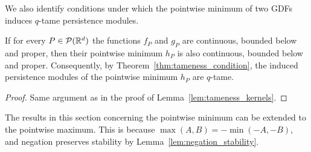 We also identify conditions under which the pointwise minimum of two GDFs
induces $q$-tame persistence modules.
\begin{lemma}
    If for every $P \in \mathcal{P}(\mathbb{R}^d)$ the functions $f_P$ and $g_P$ are
    continuous, bounded below and proper, then their pointwise minimum $h_P$
    is also continuous, bounded below and proper.
    Consequently, by Theorem~\ref{thm:tameness_condition}, the induced persistence
    modules of the pointwise minimum $h_P$ are $q$-tame.
\end{lemma}
\begin{proof}
    Same argument as in the proof of Lemma~\ref{lem:tameness_kernels}.
\end{proof}

The results in this section concerning the pointwise minimum can be extended to
the pointwise maximum.
This is because $\max(A, B) = - \min( - A, - B)$, and negation preserves
stability by Lemma~\ref{lem:negation_stability}.
